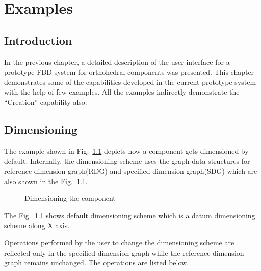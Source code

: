 \chapter{Examples}

	\section{Introduction}

		In the previous chapter, a detailed description of the user
		interface for a prototype FBD system for orthohedral components
		was presented.
		This chapter demonstrates some of the capabilities developed in
		the current prototype system with the help of few examples. 
		All the examples indirectly demonstrate the ``Creation'' capability
		also.

	\section{Dimensioning}

		The example shown in Fig.~\ref{ex1dim1} depicts how a component gets 
		dimensioned by default. Internally,
		the dimensioning scheme uses the graph data structures for reference
		dimension graph(RDG) and specified dimension graph(SDG) which are also 
		shown in the Fig.~\ref{ex1dim1}.

        \begin{figure}[htbp]
            \caption{Dimensioning the component}
            \label{ex1dim1}
        \end{figure}

		The Fig.~\ref{ex1dim1} shows default dimensioning scheme which is a
		datum dimensioning scheme along X axis.

		Operations performed by the user to change the dimensioning scheme
		are reflected only in the specified dimension graph while the reference
		dimension graph remains unchanged. 
		The operations are listed below.

